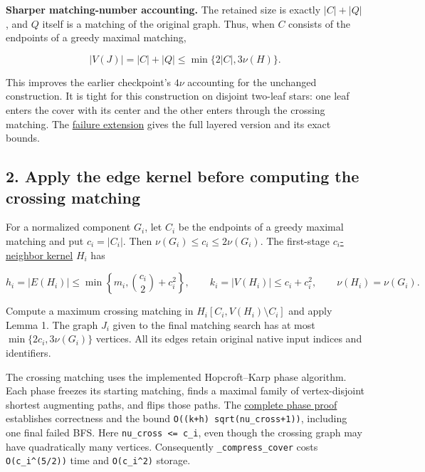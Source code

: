 \textbf{Sharper matching-number accounting.} The retained size is exactly \(|C|+|Q|\), and \(Q\) itself is a matching of the original graph. Thus, when \(C\) consists of the endpoints of a greedy maximal matching,

\[
|V(J)|=|C|+|Q|\leq\min\{2|C|,3\nu(H)\}.
\]

This improves the earlier checkpoint's \(4\nu\) accounting for the unchanged construction. It is tight for this construction on disjoint two-leaf stars: one leaf enters the cover with its center and the other enters through the crossing matching. The \href{https://github.com/icekylinx/algorithm-frontier/blob/main/problems/general-matching/reference/fault-tolerant-cover-compression.md}{failure extension} gives the full layered version and its exact bounds.

\hypertarget{af-e51d4b9b02-apply-the-edge-kernel-before-computing-the-crossing-matching}{%
\subsection{2. Apply the edge kernel before computing the crossing matching}\label{af-e51d4b9b02-apply-the-edge-kernel-before-computing-the-crossing-matching}}

For a normalized component \(G_i\), let \(C_i\) be the endpoints of a greedy maximal matching and put \(c_i=|C_i|\). Then \(\nu(G_i)\leq c_i\leq2\nu(G_i)\). The first-stage \href{https://github.com/icekylinx/algorithm-frontier/blob/main/problems/general-matching/proof.md\#31-cleanup-and-an-optional-quadratic-edge-kernel}{\(c_i\)-neighbor kernel} \(H_i\) has

\[
h_i=|E(H_i)|\leq\min\!\left\{m_i,\binom{c_i}{2}+c_i^2\right\},
\qquad
k_i=|V(H_i)|\leq c_i+c_i^2,
\qquad \nu(H_i)=\nu(G_i).
\]

Compute a maximum crossing matching in \(H_i[C_i,V(H_i)\setminus C_i]\) and apply Lemma 1. The graph \(J_i\) given to the final matching search has at most \(\min\{2c_i,3\nu(G_i)\}\) vertices. All its edges retain original native input indices and identifiers.

The crossing matching uses the implemented Hopcroft--Karp phase algorithm. Each phase freezes its starting matching, finds a maximal family of vertex-disjoint shortest augmenting paths, and flips those paths. The \href{https://github.com/icekylinx/algorithm-frontier/blob/main/problems/general-matching/reference/bipartite-proof.md\#2-the-phase-implementation}{complete phase proof} establishes correctness and the bound \texttt{O((k+h)\ sqrt(nu\_cross+1))}, including one final failed BFS. Here \texttt{nu\_cross\ \textless{}=\ c\_i}, even though the crossing graph may have quadratically many vertices. Consequently \texttt{\_compress\_cover} costs \texttt{O(c\_i\^{}(5/2))} time and \texttt{O(c\_i\^{}2)} storage.

